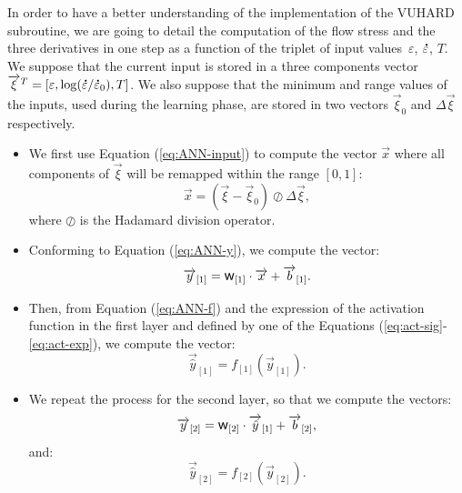\documentclass[algorithms,article,submit,pdftex,oneauthors]{Definitions/mdpi}
\DeclareRobustCommand{\w}{\mbox{\large\ensuremath{\mathsf{w}}}}
\DeclareRobustCommand{\lay}[1]{_{[#1]}}
\DeclareRobustCommand{\mdot}[1]{\accentset{\mbox{\bfseries .}}{#1}}
\begin{document}
In order to have a better understanding of the implementation of the VUHARD subroutine, we are going to detail the computation of the flow stress and the three derivatives in one step as a function of the triplet of input values~$\varepsilon$, $\mdot{\varepsilon}$, $T$.
We suppose that the current input is stored in a three components vector $\overrightarrow{\xi}^T=\left[\varepsilon, \log(\mdot{\varepsilon}/\mdot{\varepsilon}_{0}), T\right]$.
We also suppose that the minimum and range values of the inputs, used during the learning phase, are stored in two vectors $\overrightarrow{\xi}_{0}$ and $\Delta\overrightarrow{\xi}$ respectively.
\begin{itemize}
\item We first use Equation (\ref{eq:ANN-input}) to compute the vector $\overrightarrow{x}$ where all components of $\overrightarrow{\xi}$ will be remapped within the range $[0,1]$:
\begin{equation}
\overrightarrow{x}=\left(\overrightarrow{\xi}-\overrightarrow{\xi}_{0}\right)\oslash\Delta\overrightarrow{\xi}, \label{eq:ANNi1}
\end{equation}
where $\oslash$ is the Hadamard division operator.
\item Conforming to Equation (\ref{eq:ANN-y}), we compute the vector:
\begin{equation}
\overrightarrow{y}\lay{1}=\w\lay{1}\cdot\overrightarrow{x}+\overrightarrow{b}\lay{1}.\label{eq:ANNi2}
\end{equation}
\item Then, from Equation (\ref{eq:ANN-f}) and the expression of the activation function in the first layer and defined by one of the Equations (\ref{eq:act-sig}-\ref{eq:act-exp}), we compute the vector:
\begin{equation}
\overrightarrow{\hat{y}}\lay{1}=f\lay{1}(\overrightarrow{y}\lay{1}).\label{eq:ANNi3}
\end{equation}
\item We repeat the process for the second layer, so that we compute the vectors: \begin{equation}
\overrightarrow{y}\lay{2}=\w\lay{2}\cdot\overrightarrow{\hat{y}}\lay{1}+\overrightarrow{b}\lay{2},\label{eq:ANNi4}
\end{equation}
and:
\begin{equation}
\overrightarrow{\hat{y}}\lay{2}=f\lay{2}(\overrightarrow{y}\lay{2}).\label{eq:ANNi5}
\end{equation}

\end{itemize}
\end{document}
